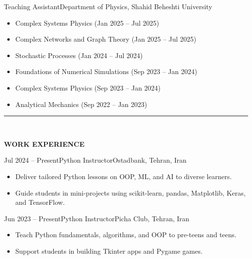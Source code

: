 \documentclass[12pt, b4paper]{cv}
\begin{document}
\begin{work}{}{Teaching Assistant}{Department of Physics, Shahid Beheshti University}
	\vspace{-0.3in}
	\begin{multicols}{2}
		\begin{itemize}
			\item Complex Systems Physics (Jan 2025 – Jul 2025)
			\item Complex Networks and Graph Theory (Jan 2025 – Jul 2025)
			\item Stochastic Processes (Jan 2024 – Jul 2024)
			\item Foundations of Numerical Simulations (Sep 2023 – Jan 2024)
			\item Complex Systems Physics (Sep 2023 – Jan 2024)
			\item Analytical Mechanics (Sep 2022 – Jan 2023)
		\end{itemize}    
	\end{multicols}
\end{work}
\vspace{-0.15in}



\vspace{-0.15in}
\rule{\textwidth}{1pt}\\
\vspace{-0.15in}

{\Large \textbf{WORK EXPERIENCE}}
\vspace{0.1in}

\begin{work}{Jul 2024 -- Present}{Python Instructor}{Ostadbank, Tehran, Iran}
\vspace{-0.1in}
	\begin{itemize}
		\item Deliver tailored Python lessons on OOP, ML, and AI to diverse learners.
		\item Guide students in mini-projects using scikit-learn, pandas, Matplotlib, Keras, and TensorFlow.
	\end{itemize}

\end{work}

\vspace{-0.1in}

\begin{work}{Jun 2023 -- Present}{Python Instructor}{Picha Club, Tehran, Iran}
\vspace{-0.1in}
\begin{itemize}
		\item Teach Python fundamentals, algorithms, and OOP to pre-teens and teens.
		\item Support students in building Tkinter apps and Pygame games.
	\end{itemize}
\end{work}
\end{document}
